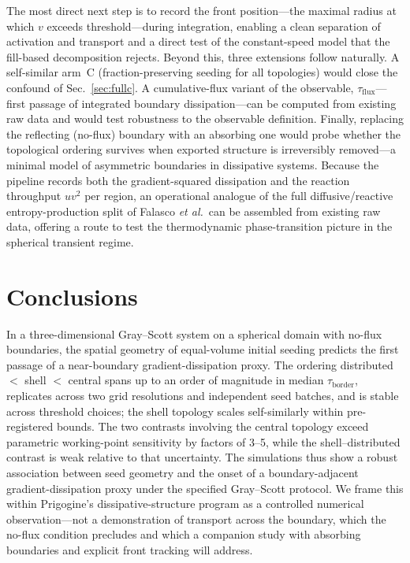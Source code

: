 \documentclass[aps,pre,preprint,superscriptaddress,nofootinbib,floatfix]{revtex4-2}
\newcommand{\tb}{\tau_{\mathrm{border}}}
\begin{document}
The most direct next step is to record the front position---the maximal radius at which $v$ exceeds threshold---during integration, enabling a clean separation of activation and transport and a direct test of the constant-speed model that the fill-based decomposition rejects. Beyond this, three extensions follow naturally. A self-similar arm~C (fraction-preserving seeding for all topologies) would close the confound of Sec.~\ref{sec:fullc}. A cumulative-flux variant of the observable, $\tau_{\mathrm{flux}}$---first passage of integrated boundary dissipation---can be computed from existing raw data and would test robustness to the observable definition. Finally, replacing the reflecting (no-flux) boundary with an absorbing one would probe whether the topological ordering survives when exported structure is irreversibly removed---a minimal model of asymmetric boundaries in dissipative systems. Because the pipeline records both the gradient-squared dissipation and the reaction throughput $uv^2$ per region, an operational analogue of the full diffusive/reactive entropy-production split of Falasco \textit{et al.}\ can be assembled from existing raw data, offering a route to test the thermodynamic phase-transition picture in the spherical transient regime.

\section{Conclusions}

In a three-dimensional Gray--Scott system on a spherical domain with no-flux boundaries, the spatial geometry of equal-volume initial seeding predicts the first passage of a near-boundary gradient-dissipation proxy. The ordering distributed $<$ shell $<$ central spans up to an order of magnitude in median $\tb$, replicates across two grid resolutions and independent seed batches, and is stable across threshold choices; the shell topology scales self-similarly within pre-registered bounds. The two contrasts involving the central topology exceed parametric working-point sensitivity by factors of \numrange{3}{5}, while the shell--distributed contrast is weak relative to that uncertainty. The simulations thus show a robust association between seed geometry and the onset of a boundary-adjacent gradient-dissipation proxy under the specified Gray--Scott protocol. We frame this within Prigogine's dissipative-structure program as a controlled numerical observation---not a demonstration of transport across the boundary, which the no-flux condition precludes and which a companion study with absorbing boundaries and explicit front tracking will address.
\end{document}
